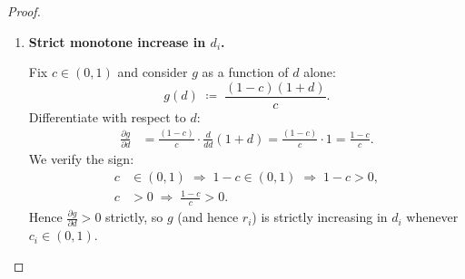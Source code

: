 \documentclass[12pt,openany]{book}
\numberwithin{equation}{chapter}
\theoremstyle{plain}
\theoremstyle{definition}
\theoremstyle{remark}
\begin{document}
\begin{proof}
\begin{enumerate}
  Fix $d \in [0,1]$ and consider $g$ as a function of $c$ alone:
  \begin{equation}
    g(c) \;\coloneqq\; \frac{(1-c)(1+d)}{c}
    \;=\; (1+d)\!\left(\frac{1}{c} - 1\right).
    \label{eq:g-c-only}
  \end{equation}
  This representation is obtained by expanding:
  \begin{align}
    \frac{(1-c)(1+d)}{c}
    &= (1+d)\,\frac{1-c}{c}
     = (1+d)\!\left(\frac{1}{c} - \frac{c}{c}\right)
     = (1+d)\!\left(\frac{1}{c} - 1\right).
    \label{eq:g-expand}
  \end{align}
  Since $(1+d) > 0$ (by (b) above), the sign of the derivative
  is determined by $\tfrac{d}{dc}\!\left(\tfrac{1}{c} - 1\right)$:
  \begin{align}
    \frac{d}{dc}\!\left(\frac{1}{c} - 1\right)
    &= -\frac{1}{c^2} \;<\; 0
    \quad \text{for all } c \in (0,1].
    \label{eq:dc-1-over-c}
  \end{align}
  Therefore:
  \begin{align}
    \frac{\partial g}{\partial c}
    &= (1+d) \cdot \left(-\frac{1}{c^2}\right)
     = -\frac{1+d}{c^2} \;<\; 0,
    \label{eq:dg-dc}
  \end{align}
  where the strict inequality holds because $(1+d) \geq 1 > 0$
  and $c^2 > 0$.  A strictly negative derivative on the open
  interval $(0,1]$ implies that $g$ (and hence $r_i$) is
  strictly decreasing in $c_i$.

  \item \textbf{Strict monotone increase in $d_i$.}

  Fix $c \in (0,1)$ and consider $g$ as a function of $d$ alone:
  \begin{equation}
    g(d) \;\coloneqq\; \frac{(1-c)(1+d)}{c}.
    \label{eq:g-d-only}
  \end{equation}
  Differentiate with respect to $d$:
  \begin{align}
    \frac{\partial g}{\partial d}
    &= \frac{(1-c)}{c} \cdot
       \frac{d}{dd}(1+d)
     = \frac{(1-c)}{c} \cdot 1
     = \frac{1-c}{c}.
    \label{eq:dg-dd}
  \end{align}
  We verify the sign:
  \begin{align}
    c &\in (0,1)
    \;\Longrightarrow\; 1 - c \in (0,1)
    \;\Longrightarrow\; 1 - c > 0,
    \label{eq:one-minus-c-pos}\\
    c &> 0
    \;\Longrightarrow\; \frac{1-c}{c} > 0.
    \label{eq:frac-pos}
  \end{align}
  Hence $\tfrac{\partial g}{\partial d} > 0$ strictly, so $g$
  (and hence $r_i$) is strictly increasing in $d_i$ whenever
  $c_i \in (0,1)$.


\end{enumerate}
\end{proof}
\end{document}
